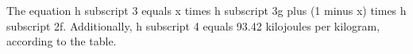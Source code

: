The equation h subscript 3 equals x times h subscript 3g plus (1 minus x) times h subscript 2f. Additionally, h subscript 4 equals 93.42 kilojoules per kilogram, according to the table.